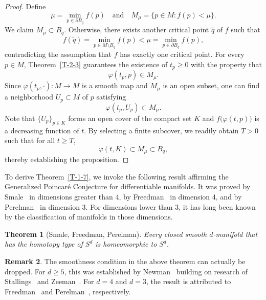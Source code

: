 \documentclass[11pt,letterpaper]{amsart}
\theoremstyle{plain}
\newtheorem{theorem}{Theorem}[section]
\theoremstyle{definition}
\newtheorem{remark}[theorem]{Remark}
\theoremstyle{remark}
\numberwithin{equation}{section}
\begin{document}
\begin{proof}
Define
\[
\mu=\min_{p\in\partial B_q} f(p)\quad\text{and}\quad M_{\mu}=\big\{p\in M: f(p)<\mu\big\}.
\]
We claim $M_{\mu}\subset B_q$. Otherwise, there exists another critical point $\tilde{q}$ of $f$ such that
\[
f(\tilde{q})=\min_{p\in M\setminus B_q} f(p)<\mu=\min_{p\in\partial B_q} f(p),
\]
contradicting the assumption that $f$ has exactly one critical point.
For every $p\in M$, Theorem~\ref{T-2-3} guarantees the existence of $t_p\geq 0$ with the property that
\[
\varphi(t_p,p)\in M_{\mu}.
\]
Since $\varphi(t_p,\cdot): M\to M$ is a smooth map and $M_{\mu}$ is an open subset, one can find a neighborhood $U_p\subset M$ of $p$ satisfying
\[
\varphi(t_p,U_p)\subset M_{\mu}.
\]
Note that $\big\{U_p\big\}_{p\in K}$ forms an open cover of the compact set $K$ and $f\big(\varphi(t,p)\big)$ is a decreasing function of $t$. By selecting a finite subcover, we readily obtain $T>0$ such that for all $t\geq T$,
\[
\varphi(t,K)\subset M_{\mu}\subset B_q,
\]
thereby establishing the proposition.
\end{proof}

To derive Theorem~\ref{T-1-7}, we invoke the following result affirming the Generalized Poincar\'{e} Conjecture for differentiable manifolds. It was proved by Smale~\cite{Smale-1961} in dimensions greater than $4$, by Freedman~\cite{Freedman-1982} in dimension $4$, and by Perelman~\cite{Perelman-2002,Perelman-2003.3,Perelman-2003.7} in dimension $3$. For dimensions lower than 3, it has long been known by the classification of manifolds in those dimensions.

\begin{theorem}[Smale, Freedman, Perelman]\label{T-2-11}
Every closed smooth $d$-manifold that has the homotopy type of $S^d$ is homeomorphic to $S^d$.
\end{theorem}

\begin{remark}
The smoothness condition in the above theorem can actually be dropped. For $d\geq5$, this was established by Newman~\cite{Newman-1966} building on research of Stallings~\cite{Stallings-1960} and Zeeman~\cite{Zeeman-1961}. For $d=4$ and $d=3$, the result is attributed to Freedman~\cite{Freedman-1982} and Perelman~\cite{Perelman-2002,Perelman-2003.3,Perelman-2003.7}, respectively.
\end{remark}
\end{document}
